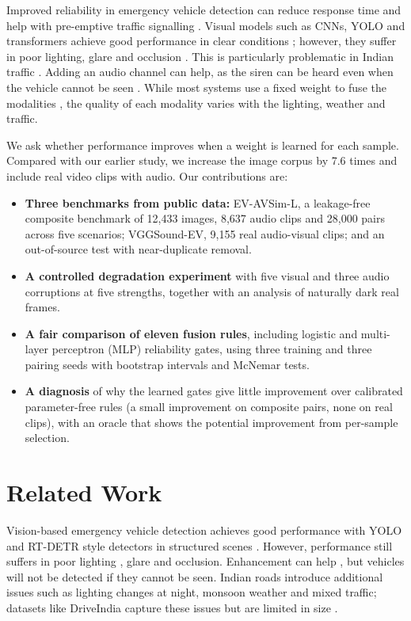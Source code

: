 \documentclass[runningheads,a4paper]{llncs}
\begin{document}
Improved reliability in emergency vehicle detection can reduce response time
and help with pre-emptive traffic signalling \cite{su2022}. Visual models such
as CNNs, YOLO and transformers achieve good performance in clear conditions
\cite{hu2025}; however, they suffer in poor lighting, glare and occlusion
\cite{li2024,alam2024}. This is particularly problematic in Indian traffic
\cite{kumar2025}. Adding an audio channel can help, as the siren can be heard
even when the vehicle cannot be seen \cite{sun2021}. While most systems use a
fixed weight to fuse the modalities \cite{baltrusaitis2019,kittler1998}, the
quality of each modality varies with the lighting, weather and traffic.

We ask whether performance improves when a weight is learned for each sample.
Compared with our earlier study, we increase the image corpus by 7.6 times and
include real video clips with audio. Our contributions are:
\begin{itemize}
\item \textbf{Three benchmarks from public data:} EV-AVSim-L, a leakage-free
composite benchmark of 12,433 images, 8,637 audio clips and 28,000 pairs across
five scenarios; VGGSound-EV, 9,155 real audio-visual clips; and an
out-of-source test with near-duplicate removal.
\item \textbf{A controlled degradation experiment} with five visual and three
audio corruptions at five strengths, together with an analysis of naturally
dark real frames.
\item \textbf{A fair comparison of eleven fusion rules}, including logistic and
multi-layer perceptron (MLP) reliability gates, using three training and three
pairing seeds with bootstrap intervals and McNemar tests.
\item \textbf{A diagnosis} of why the learned gates give little improvement
over calibrated parameter-free rules (a small improvement on composite pairs,
none on real clips), with an oracle that shows the potential improvement from
per-sample selection.
\end{itemize}

\section{Related Work}

Vision-based emergency vehicle detection achieves good performance with YOLO
and RT-DETR style detectors in structured scenes \cite{hu2025}. However,
performance still suffers in poor lighting \cite{li2024}, glare \cite{alam2024}
and occlusion. Enhancement can help \cite{li2024}, but vehicles will not be
detected if they cannot be seen. Indian roads introduce additional issues
such as lighting changes at night, monsoon weather and mixed traffic; datasets
like DriveIndia capture these issues but are limited in size \cite{kumar2025}.
\end{document}
